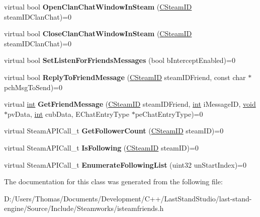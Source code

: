 \begin{DoxyCompactItemize}
\item 
\hypertarget{classISteamFriends_ac58ad29248636f3bdeab222a54edb2e5}{}virtual bool {\bfseries Open\+Clan\+Chat\+Window\+In\+Steam} (\hyperlink{classCSteamID}{C\+Steam\+I\+D} steam\+I\+D\+Clan\+Chat)=0\label{classISteamFriends_ac58ad29248636f3bdeab222a54edb2e5}

\item 
\hypertarget{classISteamFriends_affe719351751ef5b2bca280986580101}{}virtual bool {\bfseries Close\+Clan\+Chat\+Window\+In\+Steam} (\hyperlink{classCSteamID}{C\+Steam\+I\+D} steam\+I\+D\+Clan\+Chat)=0\label{classISteamFriends_affe719351751ef5b2bca280986580101}

\item 
\hypertarget{classISteamFriends_af24d827dae47dfd01349c4810c03c5eb}{}virtual bool {\bfseries Set\+Listen\+For\+Friends\+Messages} (bool b\+Intercept\+Enabled)=0\label{classISteamFriends_af24d827dae47dfd01349c4810c03c5eb}

\item 
\hypertarget{classISteamFriends_a48a60a4d7a4277bbc573928717b6a13d}{}virtual bool {\bfseries Reply\+To\+Friend\+Message} (\hyperlink{classCSteamID}{C\+Steam\+I\+D} steam\+I\+D\+Friend, const char $\ast$pch\+Msg\+To\+Send)=0\label{classISteamFriends_a48a60a4d7a4277bbc573928717b6a13d}

\item 
\hypertarget{classISteamFriends_ada1434b498ff7e1a6cb320ca8ba78c05}{}virtual \hyperlink{SDL__thread_8h_a6a64f9be4433e4de6e2f2f548cf3c08e}{int} {\bfseries Get\+Friend\+Message} (\hyperlink{classCSteamID}{C\+Steam\+I\+D} steam\+I\+D\+Friend, \hyperlink{SDL__thread_8h_a6a64f9be4433e4de6e2f2f548cf3c08e}{int} i\+Message\+I\+D, \hyperlink{SDL__audio_8h_a52835ae37c4bb905b903cbaf5d04b05f}{void} $\ast$pv\+Data, \hyperlink{SDL__thread_8h_a6a64f9be4433e4de6e2f2f548cf3c08e}{int} cub\+Data, E\+Chat\+Entry\+Type $\ast$pe\+Chat\+Entry\+Type)=0\label{classISteamFriends_ada1434b498ff7e1a6cb320ca8ba78c05}

\item 
\hypertarget{classISteamFriends_a9f5c823932e64a147f2be3ed0b99638f}{}virtual Steam\+A\+P\+I\+Call\+\_\+t {\bfseries Get\+Follower\+Count} (\hyperlink{classCSteamID}{C\+Steam\+I\+D} steam\+I\+D)=0\label{classISteamFriends_a9f5c823932e64a147f2be3ed0b99638f}

\item 
\hypertarget{classISteamFriends_aeda9f2b90c4ccb21cfa5d63cf614aa2c}{}virtual Steam\+A\+P\+I\+Call\+\_\+t {\bfseries Is\+Following} (\hyperlink{classCSteamID}{C\+Steam\+I\+D} steam\+I\+D)=0\label{classISteamFriends_aeda9f2b90c4ccb21cfa5d63cf614aa2c}

\item 
\hypertarget{classISteamFriends_a726945d52b0d104d81577a994c11e15d}{}virtual Steam\+A\+P\+I\+Call\+\_\+t {\bfseries Enumerate\+Following\+List} (uint32 un\+Start\+Index)=0\label{classISteamFriends_a726945d52b0d104d81577a994c11e15d}

\end{DoxyCompactItemize}


The documentation for this class was generated from the following file\+:\begin{DoxyCompactItemize}
\item 
D\+:/\+Users/\+Thomas/\+Documents/\+Development/\+C++/\+Last\+Stand\+Studio/last-\/stand-\/engine/\+Source/\+Include/\+Steamworks/isteamfriends.\+h\end{DoxyCompactItemize}
